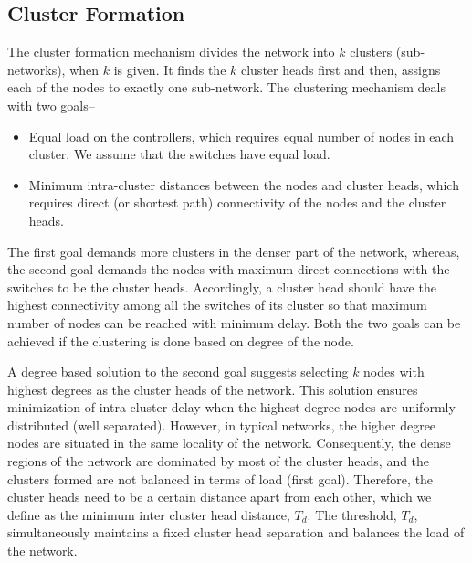 \documentclass{IEEEtran}
\begin{document}
	\subsection{Cluster Formation}
	
	The cluster formation mechanism divides the network into $k$ clusters (sub-networks), when $k$ is given. It finds the $k$ cluster heads first and then, assigns each of the nodes to exactly one sub-network. The clustering mechanism deals with two goals--
	\begin{itemize}
		\item Equal load on the controllers, which requires equal number of nodes in each cluster. We assume that the switches have equal load.
		\item Minimum intra-cluster distances between the nodes and cluster heads, which requires direct (or shortest path) connectivity of the nodes and the cluster heads.
	\end{itemize}
	
	The first goal demands more clusters in the denser part of the network, whereas, the second goal demands the nodes with maximum direct connections with the switches to be the cluster heads. Accordingly, a cluster head should have the highest connectivity among all the switches of its cluster so that maximum number of nodes can be reached with minimum delay. Both the two goals can be achieved if the clustering is done based on degree of the node.
	
	A degree based solution to the second goal suggests selecting $k$ nodes with highest degrees as the cluster heads of the network. This solution ensures minimization of intra-cluster delay when the highest degree nodes are uniformly distributed (well separated). However, in typical networks, the higher degree nodes are situated in the same locality of the network. Consequently, the dense regions of the network are dominated by most of the cluster heads, and the clusters formed are not balanced in terms of load (first goal). Therefore, the cluster heads need to be a certain distance apart from each other, which we define as the minimum inter cluster head distance, $T_d$. The threshold, $T_d$, simultaneously maintains a fixed cluster head separation and balances the load of the network.
	
	
	
\end{document}
